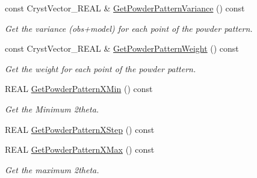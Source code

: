 \begin{DoxyCompactItemize}
\mbox{\label{class_obj_cryst_1_1_powder_pattern_a4d6afe803ededcfece841845f7cdf0e5}} 
const Cryst\+Vector\+\_\+\+R\+E\+AL \& \mbox{\hyperlink{class_obj_cryst_1_1_powder_pattern_a4d6afe803ededcfece841845f7cdf0e5}{Get\+Powder\+Pattern\+Variance}} () const
\begin{DoxyCompactList}\small\item\em Get the variance (obs+model) for each point of the powder pattern. \end{DoxyCompactList}\item 
\mbox{\label{class_obj_cryst_1_1_powder_pattern_a40085e7cb2b02fae9cd48e374db9db5f}} 
const Cryst\+Vector\+\_\+\+R\+E\+AL \& \mbox{\hyperlink{class_obj_cryst_1_1_powder_pattern_a40085e7cb2b02fae9cd48e374db9db5f}{Get\+Powder\+Pattern\+Weight}} () const
\begin{DoxyCompactList}\small\item\em Get the weight for each point of the powder pattern. \end{DoxyCompactList}\item 
\mbox{\label{class_obj_cryst_1_1_powder_pattern_ab53befb0a673360c2cbd1261f4f120c4}} 
R\+E\+AL \mbox{\hyperlink{class_obj_cryst_1_1_powder_pattern_ab53befb0a673360c2cbd1261f4f120c4}{Get\+Powder\+Pattern\+X\+Min}} () const
\begin{DoxyCompactList}\small\item\em Get the Minimum 2theta. \end{DoxyCompactList}\item 
R\+E\+AL \mbox{\hyperlink{class_obj_cryst_1_1_powder_pattern_a6c86d0b0a22155319a212bfb4629c9dd}{Get\+Powder\+Pattern\+X\+Step}} () const
\item 
\mbox{\label{class_obj_cryst_1_1_powder_pattern_a1a71f1c47f625ffeb46bddf34a6a5780}} 
R\+E\+AL \mbox{\hyperlink{class_obj_cryst_1_1_powder_pattern_a1a71f1c47f625ffeb46bddf34a6a5780}{Get\+Powder\+Pattern\+X\+Max}} () const
\begin{DoxyCompactList}\small\item\em Get the maximum 2theta. \end{DoxyCompactList}\item 
\mbox{\label{class_obj_cryst_1_1_powder_pattern_a912aabc3b801566a93ca2caab2cc1c9c}} 

\end{DoxyCompactItemize}
